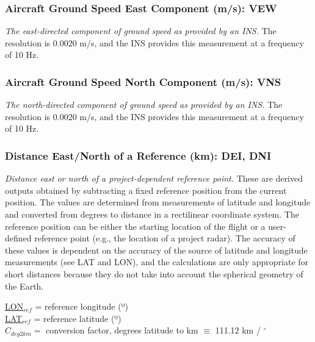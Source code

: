 \documentclass[
  english,
]{book}
\begin{document}
\hypertarget{vew}{%
\subsubsection*{Aircraft Ground Speed East Component (m/s):
VEW}\label{vew}}

\emph{The east-directed component of ground speed as provided by an
INS.} The resolution is 0.0020 m/s, and the INS provides this
measurement at a frequency of 10 Hz.

\hypertarget{vns}{%
\subsubsection*{Aircraft Ground Speed North Component (m/s):
VNS}\label{vns}}

\emph{The north-directed component of ground speed as provided by an
INS.} The resolution is 0.0020 m/s, and the INS provides this
measurement at a frequency of 10 Hz.

\hypertarget{dei-dni}{%
\subsubsection*{Distance East/North of a Reference (km): DEI,
DNI}\label{dei-dni}}

\emph{Distance east or north of a project-dependent reference point.}
These are derived outputs obtained by subtracting a fixed reference
position from the current position. The values are determined from
measurements of latitude and longitude and converted from degrees to
distance in a rectilinear coordinate system. The reference position can
be either the starting location of the flight or a user-defined
reference point (e.g., the location of a project radar). The accuracy of
these values is dependent on the accuracy of the source of latitude and
longitude measurements (see LAT and LON), and the calculations are only
appropriate for short distances because they do not take into account
the spherical geometry of the Earth.

\protect\hyperlink{longitude}{LON}\(_{ref}\) = reference longitude (º)\\
\protect\hyperlink{latitude}{LAT}\(_{ref}\) = reference latitude (º)\\
\(C_{deg2km}=\) conversion factor, degrees latitude to
km \(\equiv\)
111.12 km / \(^{\circ}\)
\end{document}
